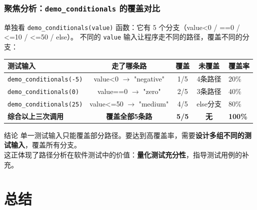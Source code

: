 \documentclass[presentation,aspectratio=169,fontset=none]{ctexbeamer}
\begin{document}

\begin{frame}
\frametitle{聚焦分析：\texttt{demo\_conditionals} 的覆盖对比}
{\footnotesize 单独看 \texttt{demo\_conditionals(value)} 函数：它有 5 个分支（value<0 / ==0 / <=10 / <=50 / else）。
不同的 \texttt{value} 输入让程序走不同的路径，覆盖不同的分支：}

\vspace{0.1cm}
\begin{table}
\centering
{\footnotesize
\begin{tabular}{lcccl}
\toprule
\textbf{测试输入} & \textbf{走了哪条路} & \textbf{覆盖} & \textbf{未覆盖} & \textbf{覆盖率} \\
\midrule
\texttt{demo\_conditionals(-5)} & value<0 $\rightarrow$ "negative" & 1/5 & 4条路径 & 20\% \\
\texttt{demo\_conditionals(0)} & value==0 $\rightarrow$ "zero" & 2/5 & 3条路径 & 40\% \\
\texttt{demo\_conditionals(25)} & value<=50 $\rightarrow$ "medium" & 4/5 & else分支 & 80\% \\
\textbf{综合以上三次调用} & \textbf{覆盖全部5条路} & \textbf{5/5} & \textbf{无} & \textbf{100\%} \\
\bottomrule
\end{tabular}}
\end{table}

\vspace{0.1cm}
{\footnotesize
\begin{block}{结论}
单一测试输入只能覆盖部分路径。要达到高覆盖率，需要\textbf{设计多组不同的测试输入}，覆盖所有分支。\\[2pt]
这正体现了路径分析在软件测试中的价值：\textbf{量化测试充分性}，指导测试用例的补充。
\end{block}}
\end{frame}


\section{总结}
\end{document}
